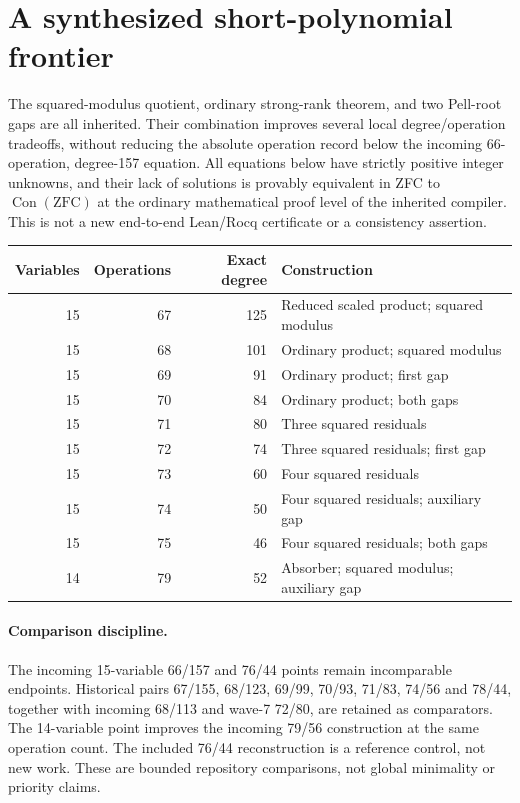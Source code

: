 \section{A synthesized short-polynomial frontier}
\label{sec:wave8-short}
The squared-modulus quotient, ordinary strong-rank theorem, and two
Pell-root gaps are all inherited. Their combination improves several
local degree/operation tradeoffs, without reducing the absolute operation
record below the incoming 66-operation, degree-157 equation.
All equations below have strictly positive integer unknowns, and their
lack of solutions is provably equivalent in ZFC to $\operatorname{Con}(\mathrm{ZFC})$
at the ordinary mathematical proof level of the inherited compiler.
This is not a new end-to-end Lean/Rocq certificate or a consistency assertion.

\begin{center}\small
\begin{tabular}{rrrl}
\toprule
Variables & Operations & Exact degree & Construction\\\midrule
15&67&125&Reduced scaled product; squared modulus\\
15&68&101&Ordinary product; squared modulus\\
15&69&91&Ordinary product; first gap\\
15&70&84&Ordinary product; both gaps\\
15&71&80&Three squared residuals\\
15&72&74&Three squared residuals; first gap\\
15&73&60&Four squared residuals\\
15&74&50&Four squared residuals; auxiliary gap\\
15&75&46&Four squared residuals; both gaps\\
14&79&52&Absorber; squared modulus; auxiliary gap\\\bottomrule
\end{tabular}\end{center}

\paragraph{Comparison discipline.}
The incoming 15-variable 66/157 and 76/44 points remain incomparable
endpoints. Historical pairs 67/155, 68/123, 69/99, 70/93, 71/83,
74/56 and 78/44, together with incoming 68/113 and wave-7 72/80,
are retained as comparators. The 14-variable point improves the incoming
79/56 construction at the same operation count. The included 76/44
reconstruction is a reference control, not new work. These are bounded
repository comparisons, not global minimality or priority claims.

